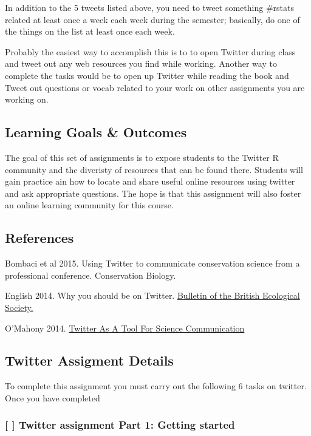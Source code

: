 \documentclass[]{article}
\begin{document}
In addition to the 5 tweets listed above, you need to tweet something
\#rstats related at least once a week each week during the semester;
basically, do one of the things on the list at least once each week.

Probably the easiest way to accomplish this is to to open Twitter during
class and tweet out any web resources you find while working. Another
way to complete the tasks would be to open up Twitter while reading the
book and Tweet out questions or vocab related to your work on other
assignments you are working on.

\subsection{Learning Goals \& Outcomes}\label{learning-goals-outcomes}

The goal of this set of assignments is to expose students to the Twitter
R community and the diveristy of resources that can be found there.
Students will gain practice ain how to locate and share useful online
resources using twitter and ask appropriate questions. The hope is that
this assignment will also foster an online learning community for this
course.

\subsection{References}\label{references}

Bombaci et al 2015. Using Twitter to communicate conservation science
from a professional conference. Conservation Biology.

English 2014. Why you should be on Twitter.
\href{https://www.britishecologicalsociety.org/wp-content/uploads/Twitter-Article.pdf}{Bulletin
of the British Ecological Society.}

O'Mahony 2014.
\href{http://www.conservationecology.org/news/twitter-as-a-tool-for-science-communication}{Twitter
As A Tool For Science Communication}

\subsection{Twitter Assigment Details}\label{twitter-assigment-details}

To complete this assignment you must carry out the following 6 tasks on
twitter. Once you have completed

\subsubsection{{[} {]} Twitter assignment Part 1: Getting
started}\label{twitter-assignment-part-1-getting-started}
\end{document}
